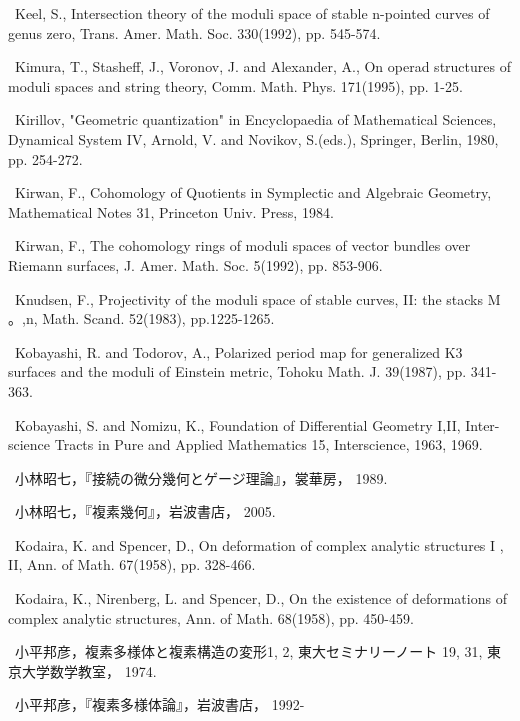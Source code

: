 {\noindent [197]\ Keel, S., Intersection theory of the moduli space of stable n-pointed curves of genus zero, Trans. Amer. Math. Soc. 330(1992), pp. 545-574.\par\smallskip
\noindent [198]\ Kimura, T., Stasheff, J., Voronov, J. and Alexander, A., On operad structures of moduli spaces and string theory, Comm. Math. Phys. 171(1995), pp. 1-25.\par\smallskip
\noindent [199]\ Kirillov, "Geometric quantization" in Encyclopaedia of Mathematical Sciences, Dynamical System IV, Arnold, V. and Novikov, S.(eds.), Springer, Berlin, 1980, pp. 254-272.\par\smallskip
\noindent [200]\ Kirwan, F., Cohomology of Quotients in Symplectic and Algebraic Geometry, Mathematical Notes 31, Princeton Univ. Press, 1984.\par\smallskip
\noindent [201]\ Kirwan, F., The cohomology rings of moduli spaces of vector bundles over Riemann surfaces, J. Amer. Math. Soc. 5(1992), pp. 853-906.\par\smallskip
\noindent [202]\ Knudsen, F., Projectivity of the moduli space of stable curves, II: the stacks M 。,n, Math. Scand. 52(1983), pp.1225-1265.\par\smallskip
\noindent [203]\ Kobayashi, R. and Todorov, A., Polarized period map for generalized K3 surfaces and the moduli of Einstein metric, Tohoku Math. J. 39(1987), pp. 341-363.\par\smallskip
\noindent [204]\ Kobayashi, S. and Nomizu, K., Foundation of Differential Geometry I,II, Inter-science Tracts in Pure and Applied Mathematics 15, Interscience, 1963, 1969.\par\smallskip
\noindent [205]\ 小林昭七，『接続の微分幾何とゲージ理論』，裳華房， 1989.\par\smallskip
\noindent [206]\ 小林昭七，『複素幾何』，岩波書店， 2005.\par\smallskip
\noindent [207]\ Kodaira, K. and Spencer, D., On deformation of complex analytic structures I , II, Ann. of Math. 67(1958), pp. 328-466.\par\smallskip
\noindent [208]\ Kodaira, K., Nirenberg, L. and Spencer, D., On the existence of deformations of complex analytic structures, Ann. of Math. 68(1958), pp. 450-459.\par\smallskip
\noindent [209]\ 小平邦彦，複素多様体と複素構造の変形1, 2, 東大セミナリーノート 19, 31, 東 京大学数学教室， 1974.\par\smallskip
\noindent [210]\ 小平邦彦，『複素多様体論』，岩波書店， 1992-\par\smallskip
}
